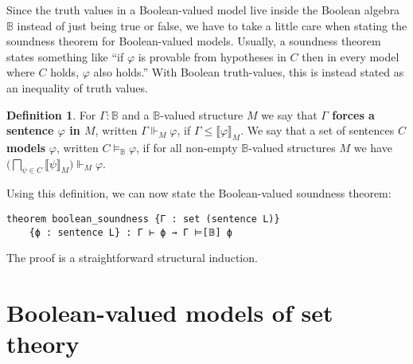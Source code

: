 \documentclass[sigplan,10pt,review]{acmart}
\newcommand{\B}{\mathbb{B}}
\theoremstyle{definition}
\newtheorem{defn}{Definition}[section]
\begin{document}
Since the truth values in a Boolean-valued model live inside the Boolean algebra $\B$ instead of just being true or false, we have to take a little care when stating the soundness theorem for Boolean-valued models.
Usually, a soundness theorem states something like ``if $\varphi$ is provable from hypotheses in $C$ then in every model where $C$ holds, $\varphi$ also holds.''
With Boolean truth-values, this is instead stated as an inequality of truth values. %
\begin{defn}
For $\Gamma : \B$ and a $\B$-valued structure $M$ we say that
\textbf{$\Gamma$ forces a sentence $\varphi$ in $M$}, written $\Gamma \Vdash_M \varphi$, if
$\Gamma \le \llbracket \varphi \rrbracket_M$.
We say that a set of sentences $C$ \textbf{models} $\varphi$, written $C \models_{\B}\varphi$, if for all non-empty $\B$-valued structures $M$ we have $\big(\bigsqcap_{\psi\in C}\big \llbracket \psi \rrbracket_M)\Vdash_M \varphi$.
\end{defn}
Using this definition, we can now state the Boolean-valued soundness theorem: \label{boolean-soundness}
\begin{lstlisting}
theorem boolean_soundness {Γ : set (sentence L)}
    {ϕ : sentence L} : Γ ⊢ ϕ → Γ ⊨[𝔹] ϕ
\end{lstlisting}
The proof is a straightforward structural induction.

\section{Boolean-valued models of set theory}
\label{sect:bset}
\end{document}
